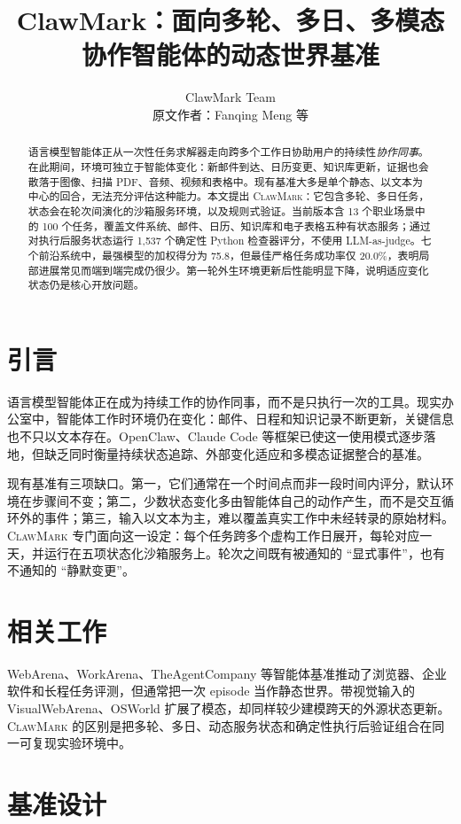 \documentclass[10pt,twocolumn]{article}
\title{ClawMark：面向多轮、多日、多模态协作智能体的动态世界基准}
\author{ClawMark Team\\\small 原文作者：Fanqing Meng 等}
\date{}
\newcommand{\bench}{\textsc{ClawMark}\xspace}
\begin{document}
\maketitle
\begin{abstract}
语言模型智能体正从一次性任务求解器走向跨多个工作日协助用户的持续性\emph{协作同事}。在此期间，环境可独立于智能体变化：新邮件到达、日历变更、知识库更新，证据也会散落于图像、扫描 PDF、音频、视频和表格中。现有基准大多是单个静态、以文本为中心的回合，无法充分评估这种能力。本文提出 \bench：它包含多轮、多日任务，状态会在轮次间演化的沙箱服务环境，以及规则式验证。当前版本含 13 个职业场景中的 100 个任务，覆盖文件系统、邮件、日历、知识库和电子表格五种有状态服务；通过对执行后服务状态运行 1,537 个确定性 Python 检查器评分，不使用 LLM-as-judge。七个前沿系统中，最强模型的加权得分为 75.8，但最佳严格任务成功率仅 20.0\%，表明局部进展常见而端到端完成仍很少。第一轮外生环境更新后性能明显下降，说明适应变化状态仍是核心开放问题。
\end{abstract}
\section{引言}
语言模型智能体正在成为持续工作的协作同事，而不是只执行一次的工具。现实办公室中，智能体工作时环境仍在变化：邮件、日程和知识记录不断更新，关键信息也不只以文本存在。OpenClaw、Claude Code 等框架已使这一使用模式逐步落地，但缺乏同时衡量持续状态追踪、外部变化适应和多模态证据整合的基准。

现有基准有三项缺口。第一，它们通常在一个时间点而非一段时间内评分，默认环境在步骤间不变；第二，少数状态变化多由智能体自己的动作产生，而不是交互循环外的事件；第三，输入以文本为主，难以覆盖真实工作中未经转录的原始材料。\bench 专门面向这一设定：每个任务跨多个虚构工作日展开，每轮对应一天，并运行在五项状态化沙箱服务上。轮次之间既有被通知的 ``显式事件''，也有不通知的 ``静默变更''。

\section{相关工作}
WebArena、WorkArena、TheAgentCompany 等智能体基准推动了浏览器、企业软件和长程任务评测，但通常把一次 episode 当作静态世界。带视觉输入的 VisualWebArena、OSWorld 扩展了模态，却同样较少建模跨天的外源状态更新。\bench 的区别是把多轮、多日、动态服务状态和确定性执行后验证组合在同一可复现实验环境中。

\section{基准设计}
\end{document}
